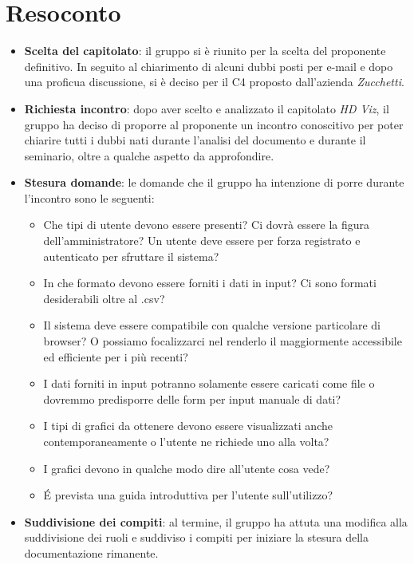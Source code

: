 \section{Resoconto}
\begin{itemize}

\item \textbf{Scelta del capitolato}: il gruppo si è riunito per la scelta del proponente definitivo. In seguito al chiarimento di alcuni dubbi posti per e-mail e dopo una proficua discussione, si è deciso per il  C4 proposto dall'azienda \textit{Zucchetti}.

\item \textbf{Richiesta incontro}: dopo aver scelto e analizzato il capitolato \textit{HD Viz}, il gruppo ha deciso di proporre al proponente un incontro conoscitivo per poter chiarire tutti i dubbi nati durante l’analisi del documento e durante il seminario, oltre a qualche aspetto da approfondire.

\item \textbf{Stesura domande}: le domande che il gruppo ha intenzione di porre durante l'incontro sono le seguenti:
\begin{itemize}
\item Che tipi di utente devono essere presenti? Ci dovrà essere la figura dell'amministratore? Un utente deve essere per forza registrato e autenticato per sfruttare il sistema?
\item In che formato devono essere forniti i dati in input? Ci sono formati desiderabili oltre al .csv?
\item Il sistema deve essere compatibile con qualche versione particolare di browser? O possiamo focalizzarci nel renderlo il maggiormente accessibile ed efficiente per i più recenti?
\item I dati forniti in input potranno solamente essere caricati come file o dovremmo predisporre delle form per input manuale di dati?
\item I tipi di grafici da ottenere devono essere visualizzati anche contemporaneamente o l'utente ne richiede uno alla volta?
\item I grafici devono in qualche modo dire all'utente cosa vede?
\item \'E prevista una guida introduttiva per l'utente sull'utilizzo?
\end{itemize}

\item \textbf{Suddivisione dei compiti}: al termine, il gruppo ha attuta una modifica alla suddivisione dei ruoli e suddiviso i compiti per iniziare la stesura della documentazione rimanente.

\end{itemize}